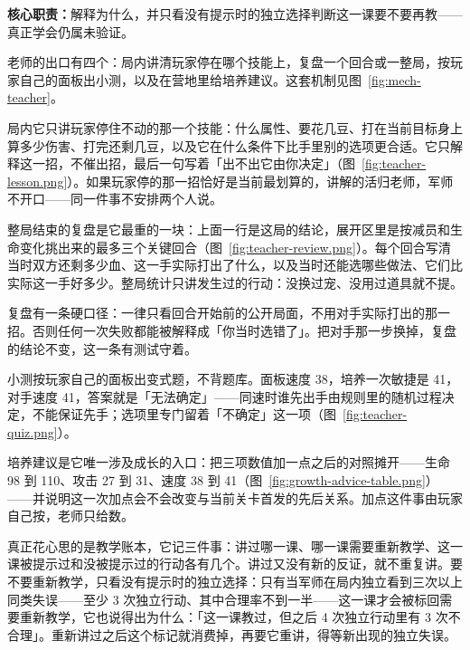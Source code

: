 \noindent\textbf{核心职责：}解释为什么，并只看没有提示时的独立选择判断这一课要不要再教——真正学会仍属未验证。\par\vspace{0.15em}



老师的出口有四个：局内讲清玩家停在哪个技能上，复盘一个回合或一整局，按玩家自己的面板出小测，以及在营地里给培养建议。这套机制见图~\ref{fig:mech-teacher}。

局内它只讲玩家停住不动的那一个技能：什么属性、要花几豆、打在当前目标身上算多少伤害、打完还剩几豆，以及它在什么条件下比手里别的选项更合适。它只解释这一招，不催出招，最后一句写着「出不出它由你决定」（图~\ref{fig:teacher-lesson.png}）。如果玩家停的那一招恰好是当前最划算的，讲解的活归老师，军师不开口——同一件事不安排两个人说。


整局结束的复盘是它最重的一块：上面一行是这局的结论，展开区里是按减员和生命变化挑出来的最多三个关键回合（图~\ref{fig:teacher-review.png}）。每个回合写清当时双方还剩多少血、这一手实际打出了什么，以及当时还能选哪些做法、它们比实际这一手好多少。整局统计只讲发生过的行动：没换过宠、没用过道具就不提。


复盘有一条硬口径：一律只看回合开始前的公开局面，不用对手实际打出的那一招。否则任何一次失败都能被解释成「你当时选错了」。把对手那一步换掉，复盘的结论不变，这一条有测试守着。

小测按玩家自己的面板出变式题，不背题库。面板速度 38，培养一次敏捷是 41，对手速度 41，答案就是「无法确定」——同速时谁先出手由规则里的随机过程决定，不能保证先手；选项里专门留着「不确定」这一项（图~\ref{fig:teacher-quiz.png}）。


培养建议是它唯一涉及成长的入口：把三项数值加一点之后的对照摊开——生命 98 到 110、攻击 27 到 31、速度 38 到 41（图~\ref{fig:growth-advice-table.png}）——并说明这一次加点会不会改变与当前关卡首发的先后关系。加点这件事由玩家自己按，老师只给数。


真正花心思的是教学账本，它记三件事：讲过哪一课、哪一课需要重新教学、这一课被提示过和没被提示过的行动各有几个。讲过又没有新的反证，就不重复讲。要不要重新教学，只看没有提示时的独立选择：只有当军师在局内独立看到三次以上同类失误——至少 3 次独立行动、其中合理率不到一半——这一课才会被标回需要重新教学，它也说得出为什么：「这一课教过，但之后 4 次独立行动里有 3 次不合理」。重新讲过之后这个标记就消费掉，再要它重讲，得等新出现的独立失误。

